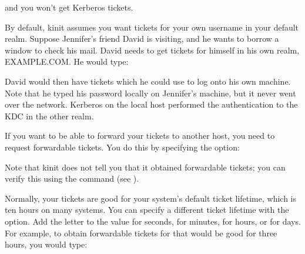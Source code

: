 \documentclass[letterpaper,10pt,english]{sphinxmanual}
\begin{document}
and you won’t get Kerberos tickets.

By default, kinit assumes you want tickets for your own username in
your default realm.  Suppose Jennifer’s friend David is visiting, and
he wants to borrow a window to check his mail.  David needs to get
tickets for himself in his own realm, EXAMPLE.COM.  He would type:

%
\begin{sphinxVerbatim}[commandchars=\\\{\}]
  
    \PYG{p}{[} \PYG{l+s+s1}{s password here.]}
\end{sphinxVerbatim}

David would then have tickets which he could use to log onto his own
machine.  Note that he typed his password locally on Jennifer’s
machine, but it never went over the network.  Kerberos on the local
host performed the authentication to the KDC in the other realm.

If you want to be able to forward your tickets to another host, you
need to request forwardable tickets.  You do this by specifying the
 option:

%
\begin{sphinxVerbatim}[commandchars=\\\{\}]
  
    \PYG{p}{[}   \PYG{p}{]}
\end{sphinxVerbatim}

Note that kinit does not tell you that it obtained forwardable
tickets; you can verify this using the {\hyperref[\detokenize{user/user_commands/klist:klist-1}]{}} command (see
{\hyperref[\detokenize{user/tkt_mgmt:view-tkt}]{}}).

Normally, your tickets are good for your system’s default ticket
lifetime, which is ten hours on many systems.  You can specify a
different ticket lifetime with the  option.  Add the letter
 to the value for seconds,  for minutes,  for hours, or
 for days.  For example, to obtain forwardable tickets for
 that would be good for three hours, you would
type:
\end{document}
